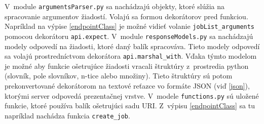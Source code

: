 \documentclass[zadani,slovak]{fitthesis}
\begin{document}
V~module \texttt{argumentsParser.py} sa nachádzajú objekty, ktoré slúžia na spracovanie argumentov žiadostí. Volajú sa formou dekorátorov pred funkciou. Napríklad na výpise \ref{endpointClass} je možné vidieť volanie \texttt{jobList\_arguments} pomocou dekorátoru \texttt{api.expect}. V~module \texttt{responseModels.py} sa nachádzajú modely odpovedí na žiadosti, ktoré daný balík spracováva. Tieto modely odpovedí sa volajú prostredníctvom dekorátora \texttt{api.marshal\_with}. Vďaka týmto modelom je možné aby funkcie ošetrujúce žiadosti vracali štruktúry z~prostredia python (slovník, pole slovníkov, n-tice alebo množiny). Tieto štruktúry sú potom prekonvertované dekorátorom na textové reťazce vo formáte JSON (viď \ref{json}), ktorými server odpovedá prezentačnej vrstve. V~modele \texttt{functions.py} sú uložené funkcie, ktoré používa balík ošetrujúci sadu URI. Z~výpisu \ref{endpointClass} sa tu napríklad nachádza funkcia \texttt{create\_job}.
\end{document}
